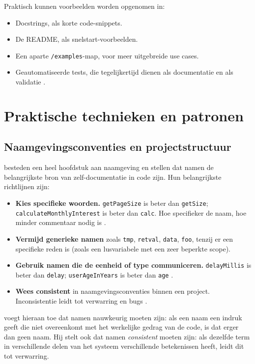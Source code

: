 Praktisch kunnen voorbeelden worden opgenomen in:
\begin{itemize}
    \item Docstrings, als korte code-snippets.
    \item De README, als snelstart-voorbeelden.
    \item Een aparte \texttt{/examples}-map, voor meer uitgebreide use cases.
    \item Geautomatiseerde tests, die tegelijkertijd dienen als documentatie en als validatie \autocite{martraire2019livingdocumentation}.
\end{itemize}


\section{Praktische technieken en patronen}
\label{sec:cad-technieken}

\subsection{Naamgevingsconventies en projectstructuur}
\textcite{boswell2011readablecode} besteden een heel hoofdstuk aan naamgeving en stellen dat namen de belangrijkste bron van zelf-documentatie in code zijn. Hun belangrijkste richtlijnen zijn:

\begin{itemize}
    \item \textbf{Kies specifieke woorden.} \texttt{getPageSize} is beter dan \texttt{getSize}; \texttt{calculateMonthlyInterest} is beter dan \texttt{calc}. Hoe specifieker de naam, hoe minder commentaar nodig is \autocite{boswell2011readablecode}.
    \item \textbf{Vermijd generieke namen} zoals \texttt{tmp}, \texttt{retval}, \texttt{data}, \texttt{foo}, tenzij er een specifieke reden is (zoals een lusvariabele met een zeer beperkte scope).
    \item \textbf{Gebruik namen die de eenheid of type communiceren.} \texttt{delayMillis} is beter dan \texttt{delay}; \texttt{userAgeInYears} is beter dan \texttt{age} \autocite{boswell2011readablecode}.
    \item \textbf{Wees consistent} in naamgevingsconventies binnen een project. Inconsistentie leidt tot verwarring en bugs \autocite{martin2008clean}.
\end{itemize}

\textcite{ousterhout2018philosophy} voegt hieraan toe dat namen nauwkeurig moeten zijn: als een naam een indruk geeft die niet overeenkomt met het werkelijke gedrag van de code, is dat erger dan geen naam. Hij stelt ook dat namen \textit{consistent} moeten zijn: als dezelfde term in verschillende delen van het systeem verschillende betekenissen heeft, leidt dit tot verwarring.

